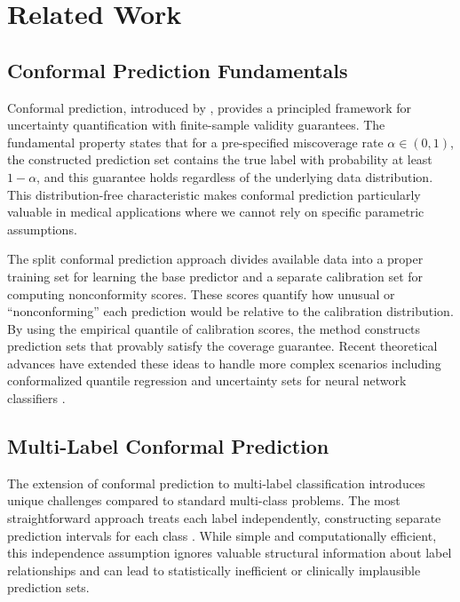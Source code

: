 \section{Related Work}
\label{sec:related-work}

\subsection{Conformal Prediction Fundamentals}
\label{subsec:conformal-prediction-fundamentals}

Conformal prediction, introduced by \citet{vovk2005algorithmic}, provides a principled framework for uncertainty quantification with finite-sample validity guarantees.
The fundamental property states that for a pre-specified miscoverage rate $\alpha \in (0,1)$, the constructed prediction set contains the true label with probability at least $1-\alpha$, and this guarantee holds regardless of the underlying data distribution.
This distribution-free characteristic makes conformal prediction particularly valuable in medical applications where we cannot rely on specific parametric assumptions.

The split conformal prediction approach \citep{papadopoulos2002inductive} divides available data into a proper training set for learning the base predictor and a separate calibration set for computing nonconformity scores.
These scores quantify how unusual or ``nonconforming'' each prediction would be relative to the calibration distribution.
By using the empirical quantile of calibration scores, the method constructs prediction sets that provably satisfy the coverage guarantee.
Recent theoretical advances have extended these ideas to handle more complex scenarios including conformalized quantile regression \citep{romano2019conformalized} and uncertainty sets for neural network classifiers \citep{angelopoulos2020uncertainty}.

\subsection{Multi-Label Conformal Prediction}
\label{subsec:multi-label-conformal-prediction}

The extension of conformal prediction to multi-label classification introduces unique challenges compared to standard multi-class problems.
The most straightforward approach treats each label independently, constructing separate prediction intervals for each class \citep{sadinle2019least}.
While simple and computationally efficient, this independence assumption ignores valuable structural information about label relationships and can lead to statistically inefficient or clinically implausible prediction sets.

